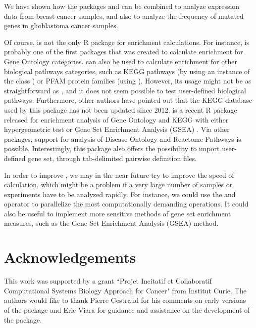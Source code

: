 We have shown how the packages  and  can be
combined to analyze expression data from breast cancer samples, and also to
analyze the frequency of mutated genes in glioblastoma cancer samples.  

Of course,  is not the only R package for enrichment
calculations. For instance,  \citep{falcon2007using} is probably
one of the first packages that was created to calculate enrichment for Gene
Ontology categories.   can also be used to calculate enrichment for
other biological pathways categories, such as KEGG pathways (by using an
instance of the class ) or PFAM protein families (using
). However, its usage might not be as straightforward as
, and it does not seem possible to test user-defined biological
pathways. Furthermore, other authors have pointed out that the KEGG database
used by this package has not been updated since 2012.  is a
recent R package released for enrichment analysis of Gene Ontology and KEGG with
either hypergeometric test or Gene Set Enrichment Analysis (GSEA)
\citep{yu2012clusterprofiler}. Via other packages, support for analysis of
Disease Ontology and Reactome Pathways is possible. Interestingly, this package
also offers the possibility to import user-defined gene set, through
tab-delimited pairwise definition files.   

In order to improve , we may in the near future try to improve
the speed of calculation, which might be a problem if a very large number of
samples or experiments have to be analyzed rapidly. For instance, we could use
the  and  operator to parallelize the most
computationally demanding operations. It could also be useful to implement more
sensitive methods of gene set enrichment measures, such as the Gene Set
Enrichment Analysis (GSEA) method. 


\section[Acknowledgments]{Acknowledgements}

This work was supported by a grant ``Projet Incitatif et Collaboratif
Computational Systems Biology Approach for Cancer" from Institut Curie. The
authors would like to thank Pierre Gestraud for his comments on early versions
of the  package and Eric Viara for guidance and assistance on
the development of the  package.


